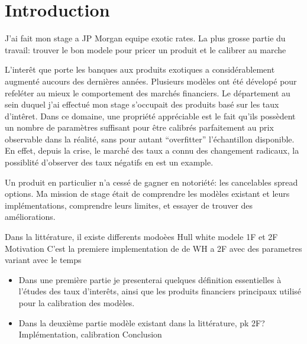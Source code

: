 

\chapter*{Introduction}

J'ai fait mon stage a JP Morgan equipe exotic rates.
La plus grosse partie du travail: trouver le bon modele pour pricer un produit et le calibrer au marche

L'interêt que porte les banques aux produits exotiques a considérablement augmenté aucours des dernières années. Plusieurs modèles ont été dévelopé pour refeléter au mieux le comportement des marchés financiers.
Le département au sein duquel j'ai effectué mon stage s'occupait des produits basé sur les taux d'intêret. Dans ce domaine, une propriété appréciable est le fait qu'ils possèdent un nombre de paramètres suffisant pour être calibrés parfaitement au prix observable dans la réalité, sans pour autant ``overfitter'' l'échantillon disponible. En effet, depuis la crise, le marché des taux a connu des changement radicaux, la possiblité d'observer des taux négatifs en est un example. 

Un produit en particulier n'a cessé de  gagner en notoriété: les cancelables spread options. Ma mission de stage était de comprendre les modèles existant et leurs implémentations, comprendre leurs limites, et essayer de trouver des améliorations.



Dans la littérature, il existe differents modoèes Hull white modele 1F et 2F 
Motivation
C'est la premiere implementation de de WH a 2F avec des parametres variant avec le temps
\begin{itemize}
\item 
  Dans une première partie je presenterai quelques définition essentielles à l'études des taux d'interêts, ainsi que les produits financiers principaux utilisé pour la calibration des modèles.
\item 
Dans la deuxième partie modèle existant dans la littérature, pk 2F?
Implémentation, calibration
Conclusion

\end{itemize}
